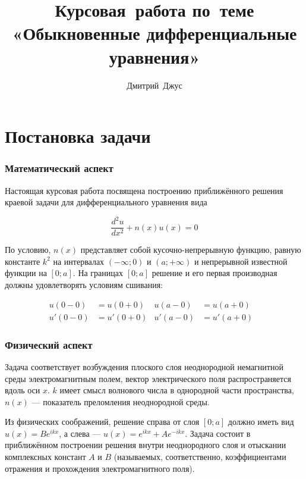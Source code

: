 \documentclass{article}
\numberwithin{equation}{section}
\begin{document}
\author{Дмитрий Джус}
\title{Курсовая работа по теме\\ «Обыкновенные дифференциальные уравнения»}
\maketitle

\clearpage

\tableofcontents

\clearpage
\part{Постановка задачи}

\section{Математический аспект}

Настоящая курсовая работа посвящена построению приближённого решения
краевой задачи для дифференциального уравнения вида

\begin{equation}\label{deq}
  \frac{d^2 u}{dx^2} + n(x) u(x) = 0
\end{equation}

По условию, $n(x)$ представляет собой кусочно-непрерывную функцию,
равную константе $k^2$ на интервалах $(-\infty; 0)$ и $(a; +\infty)$ и
непрерывной известной функции на $[0; a]$. На границах $[0; a]$
решение и его первая производная должны удовлетворять условиям
сшивания:

\begin{subequations}\label{conds}
  \begin{align}
    u(0-0)& = u(0+0)&
    u(a-0)& = u(a+0)& \\
    u'(0-0)& = u'(0+0)&
    u'(a-0)& = u'(a+0)&
  \end{align}
\end{subequations}

\section{Физический аспект}

Задача соответствует возбуждения плоского слоя неоднородной
немагнитной среды электромагнитным полем, вектор электрического поля
распространяется вдоль оси $x$. $k$ имеет смысл волнового числа в
однородной части пространства, $n(x)$ — показатель преломления
неоднородной среды.

Из физических соображений, решение справа от слоя $[0; a]$ должно
иметь вид $u(x) = Be^{ikx}$, а слева — $u(x) = e^{ikx} +
Ae^{-ikx}$. Задача состоит в приближённом построении решения внутри
неоднородного слоя и отыскании комплексных констант $A$ и $B$
(называемых, соответственно, коэффициентами отражения и прохождения
электромагнитного поля).
\end{document}
